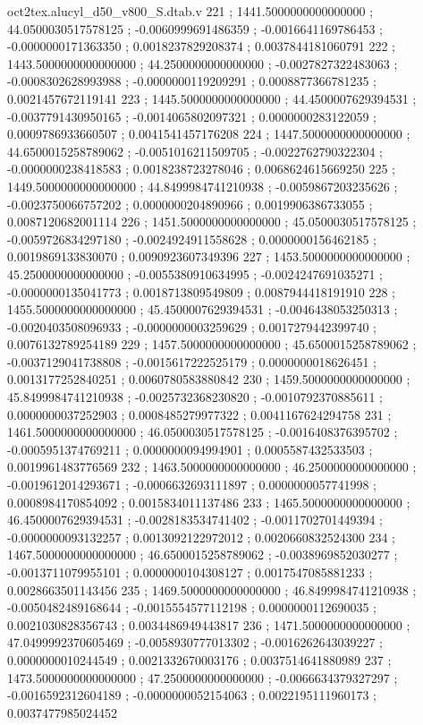 \begin{filecontents}[overwrite]{oct2tex.alucyl_d50_v800_S.dtab.v}
221 ; 1441.5000000000000000 ; 44.0500030517578125 ; -0.0060999691486359 ; -0.0016641169786453 ; -0.0000000171363350 ; 0.0018237829208374 ; 0.0037844181060791
222 ; 1443.5000000000000000 ; 44.2500000000000000 ; -0.0027827322483063 ; -0.0008302628993988 ; -0.0000000119209291 ; 0.0008877366781235 ; 0.0021457672119141
223 ; 1445.5000000000000000 ; 44.4500007629394531 ; -0.0037791430950165 ; -0.0014065802097321 ; 0.0000000283122059 ; 0.0009786933660507 ; 0.0041541457176208
224 ; 1447.5000000000000000 ; 44.6500015258789062 ; -0.0051016211509705 ; -0.0022762790322304 ; -0.0000000238418583 ; 0.0018238723278046 ; 0.0068624615669250
225 ; 1449.5000000000000000 ; 44.8499984741210938 ; -0.0059867203235626 ; -0.0023750066757202 ; 0.0000000204890966 ; 0.0019906386733055 ; 0.0087120682001114
226 ; 1451.5000000000000000 ; 45.0500030517578125 ; -0.0059726834297180 ; -0.0024924911558628 ; 0.0000000156462185 ; 0.0019869133830070 ; 0.0090923607349396
227 ; 1453.5000000000000000 ; 45.2500000000000000 ; -0.0055380910634995 ; -0.0024247691035271 ; -0.0000000135041773 ; 0.0018713809549809 ; 0.0087944418191910
228 ; 1455.5000000000000000 ; 45.4500007629394531 ; -0.0046438053250313 ; -0.0020403508096933 ; -0.0000000003259629 ; 0.0017279442399740 ; 0.0076132789254189
229 ; 1457.5000000000000000 ; 45.6500015258789062 ; -0.0037129041738808 ; -0.0015617222525179 ; 0.0000000018626451 ; 0.0013177252840251 ; 0.0060780583880842
230 ; 1459.5000000000000000 ; 45.8499984741210938 ; -0.0025732368230820 ; -0.0010792370885611 ; 0.0000000037252903 ; 0.0008485279977322 ; 0.0041167624294758
231 ; 1461.5000000000000000 ; 46.0500030517578125 ; -0.0016408376395702 ; -0.0005951374769211 ; 0.0000000094994901 ; 0.0005587432533503 ; 0.0019961483776569
232 ; 1463.5000000000000000 ; 46.2500000000000000 ; -0.0019612014293671 ; -0.0006632693111897 ; 0.0000000057741998 ; 0.0008984170854092 ; 0.0015834011137486
233 ; 1465.5000000000000000 ; 46.4500007629394531 ; -0.0028183534741402 ; -0.0011702701449394 ; -0.0000000093132257 ; 0.0013092122972012 ; 0.0020660832524300
234 ; 1467.5000000000000000 ; 46.6500015258789062 ; -0.0038969852030277 ; -0.0013711079955101 ; 0.0000000104308127 ; 0.0017547085881233 ; 0.0028663501143456
235 ; 1469.5000000000000000 ; 46.8499984741210938 ; -0.0050482489168644 ; -0.0015554577112198 ; 0.0000000112690035 ; 0.0021030828356743 ; 0.0034486949443817
236 ; 1471.5000000000000000 ; 47.0499992370605469 ; -0.0058930777013302 ; -0.0016262643039227 ; 0.0000000010244549 ; 0.0021332670003176 ; 0.0037514641880989
237 ; 1473.5000000000000000 ; 47.2500000000000000 ; -0.0066634379327297 ; -0.0016592312604189 ; -0.0000000052154063 ; 0.0022195111960173 ; 0.0037477985024452

\end{filecontents}
